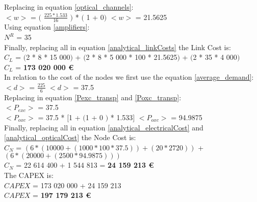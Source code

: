 Replacing in equation \ref{optical_channels}:\\

$<w>$ = $($ $\frac{225 * 1.533}{16}$ $)$ * $($ 1 + 0$)$ \qquad \qquad $<w>$ = 21.5625\\

Using equation \ref{amplifiers}:\\

$N^R$ = 35\\

Finally, replacing all in equation \ref{analytical_linkCosts} the Link Cost is:\\

$C_L$ = $($2 * 8 * 15 000$)$ + $($2 * 8 * 5 000 * 100 * 21.5625$)$ + $($2 * 35 * 4 000$)$\\

$C_L$ = \textbf{173 020 000 \euro}\\

In relation to the cost of the nodes we first use the equation \ref{average_demand}:\\

$<d>$ = $\frac{225}{6}$ \qquad \qquad $<d>$ = 37.5\\

Replacing in equation \ref{Pexc_transp} and \ref{Poxc_transp}:\\

$<P_{exc}>$ = 37.5\\

$<P_{oxc}>$ = 37.5 * $[$1 + $($1 + $0$ $)$ * 1.533$]$ \qquad \quad $<P_{oxc}>$ = 94.9875 \\

Finally, replacing all in equation \ref{analytical_electricalCost} and \ref{analytical_opticalCost} the Node Cost is:\\

$C_N$ = $\left(6 * (10 000 + (1 000 * 100 * 37.5)) + (20 * 2 720)\right)$ + $\left(6 * (20 000 + (2 500 * 94.9875)) \right)$\\

$C_N$ = 22 614 400 + 1 544 813 = \textbf{24 159 213 \euro}\\

The CAPEX is:\\
$CAPEX$ = 173 020 000 + 24 159 213\\

$CAPEX$ = \textbf{197 179 213 \euro}\\

